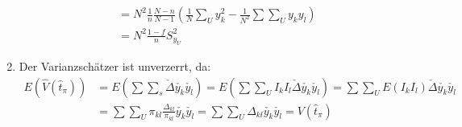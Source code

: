 \documentclass{article}
\begin{document}
\begin{solution}
\begin{enumerate}
\begin{align*}
&= N^2\frac{1}{n}\frac{N-n}{N-1}\left(\frac{1}{N}\sum_U y_k^2 - \frac{1}{N^2}\sum\sum_{U}y_k y_l\right)\\
&=N^2\frac{1-f}{n} S_{y_U}^2
\end{align*}
\item Der Varianzschätzer ist unverzerrt, da:
\begin{align*}
E\left(\hat{V}(\hat{t}_\pi)\right) &= E\left(\sum\sum_s \check{\Delta}\check{y_k}\check{y_l}\right) = E\left(\sum\sum_U I_k I_l\check{\Delta}\check{y_k}\check{y_l}\right) = \sum\sum_U E(I_k I_l)\check{\Delta}\check{y_k}\check{y_l} \\
&= \sum\sum_U \pi_{kl} \frac{\Delta_{kl}}{\pi_{kl}} \check{y_k}\check{y_l} = \sum\sum_U \Delta_{kl}\check{y_k}\check{y_l} = V(\hat{t}_\pi)
\end{align*}
\end{enumerate}
\end{solution}
	
\end{document}
